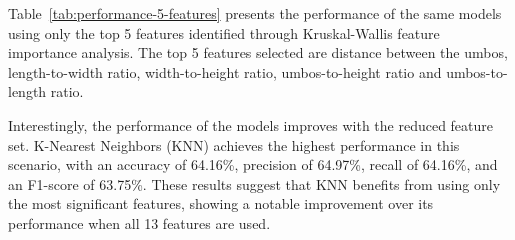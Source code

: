 Table~\ref{tab:performance-5-features} presents the performance of the same models using only the top 5 features identified through Kruskal-Wallis feature importance analysis. The top 5 features selected are distance between the umbos, length-to-width ratio, width-to-height ratio, umbos-to-height ratio and umbos-to-length ratio. 

Interestingly, the performance of the models improves with the reduced feature set. K-Nearest Neighbors (KNN) achieves the highest performance in this scenario, with an accuracy of 64.16\%, precision of 64.97\%, recall of 64.16\%, and an F1-score of 63.75\%. These results suggest that KNN benefits from using only the most significant features, showing a notable improvement over its performance when all 13 features are used. 